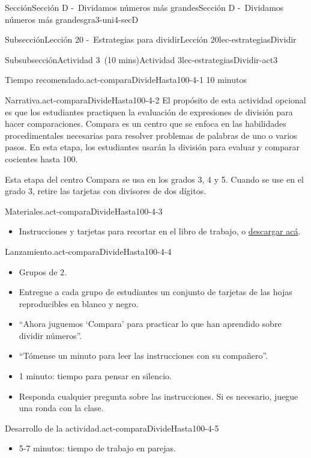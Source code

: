 \documentclass[oneside,10pt,]{article}
\begin{document}
\begin{sectionptx}{Sección}{Sección D -~Dividamos números más grandes}{}{Sección D -~Dividamos números más grandes}{}{}{gra3-uni4-secD}
\begin{subsectionptx}{Subsección}{Lección 20 -~Estrategias para dividir}{}{Lección 20}{}{}{lec-estrategiasDividir}
\begin{subsubsectionptx}{Subsubsección}{Actividad 3~(10 mins)}{}{Actividad 3}{}{}{lec-estrategiasDividir-act3}
\begin{paragraphs}{Tiempo recomendado.}{act-comparaDivideHasta100-4-1}%
10 minutos%
\end{paragraphs}%
\begin{paragraphs}{Narrativa.}{act-comparaDivideHasta100-4-2}%
El propósito de esta actividad opcional es que los estudiantes practiquen la evaluación de expresiones de división para hacer comparaciones. Compara es un centro que se enfoca en las habilidades procedimentales necesarias para resolver problemas de palabras de uno o varios pasos. En esta etapa, los estudiantes usarán la división para evaluar y comparar cocientes hasta 100.%
\par
Esta etapa del centro Compara se usa en los grados 3, 4 y 5. Cuando se use en el grado 3, retire las tarjetas con divisores de dos dígitos.%
\end{paragraphs}%
\begin{paragraphs}{Materiales.}{act-comparaDivideHasta100-4-3}%
%
\begin{itemize}[label=\textbullet]
\item{}Instrucciones y tarjetas para recortar en el libro de trabajo, o \href{external/act-pdf/act-comparaDivideHasta100.pdf}{descargar acá}\footnotemark{}.%
\end{itemize}
\end{paragraphs}%
\begin{paragraphs}{Lanzamiento.}{act-comparaDivideHasta100-4-4}%
%
\begin{itemize}[label=\textbullet]
\item{}Grupos de 2.%
\item{}Entregue a cada grupo de estudiantes un conjunto de tarjetas de las hojas reproducibles en blanco y negro.%
\item{}``Ahora juguemos ‘Compara’ para practicar lo que han aprendido sobre dividir números''.%
\item{}``Tómense un minuto para leer las instrucciones con su compañero''.%
\item{}1 minuto: tiempo para pensar en silencio.%
\item{}Responda cualquier pregunta sobre las instrucciones. Si es necesario, juegue una ronda con la clase.%
\end{itemize}
\end{paragraphs}%
\begin{paragraphs}{Desarrollo de la actividad.}{act-comparaDivideHasta100-4-5}%
%
\begin{itemize}[label=\textbullet]
\item{}5-7 minutos: tiempo de trabajo en parejas.%

\end{itemize}
\end{paragraphs}
\end{subsubsectionptx}
\end{subsectionptx}
\end{sectionptx}
\end{document}
